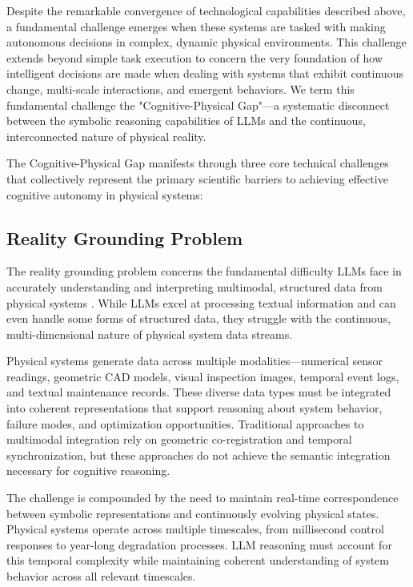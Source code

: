 Despite the remarkable convergence of technological capabilities described above, a fundamental challenge emerges when these systems are tasked with making autonomous decisions in complex, dynamic physical environments. This challenge extends beyond simple task execution to concern the very foundation of how intelligent decisions are made when dealing with systems that exhibit continuous change, multi-scale interactions, and emergent behaviors. We term this fundamental challenge the "Cognitive-Physical Gap"—a systematic disconnect between the symbolic reasoning capabilities of LLMs and the continuous, interconnected nature of physical reality.

The Cognitive-Physical Gap manifests through three core technical challenges that collectively represent the primary scientific barriers to achieving effective cognitive autonomy in physical systems:

\subsection{Reality Grounding Problem}

The reality grounding problem concerns the fundamental difficulty LLMs face in accurately understanding and interpreting multimodal, structured data from physical systems \cite{harnad1990symbol, barsalou2008grounded}. While LLMs excel at processing textual information and can even handle some forms of structured data, they struggle with the continuous, multi-dimensional nature of physical system data streams.

Physical systems generate data across multiple modalities—numerical sensor readings, geometric CAD models, visual inspection images, temporal event logs, and textual maintenance records. These diverse data types must be integrated into coherent representations that support reasoning about system behavior, failure modes, and optimization opportunities. Traditional approaches to multimodal integration rely on geometric co-registration and temporal synchronization, but these approaches do not achieve the semantic integration necessary for cognitive reasoning.

The challenge is compounded by the need to maintain real-time correspondence between symbolic representations and continuously evolving physical states. Physical systems operate across multiple timescales, from millisecond control responses to year-long degradation processes. LLM reasoning must account for this temporal complexity while maintaining coherent understanding of system behavior across all relevant timescales.


